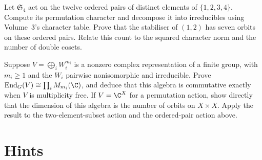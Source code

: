 \begin{exercise}[$\star\star$]\label{ex:v10exp-ch09-orderedpairs}
Let $\mathfrak S_4$ act on the twelve ordered pairs of distinct elements of $\{1,2,3,4\}$. Compute its permutation character and decompose it into irreducibles using Volume~3's character table. Prove that the stabiliser of $(1,2)$ has seven orbits on these ordered pairs. Relate this count to the squared character norm and the number of double cosets.
\end{exercise}

\begin{exercise}[$\star\star\star$]\label{ex:v10exp-ch09-commutant}
Suppose $V=\bigoplus_i W_i^{m_i}$ is a nonzero complex representation of a finite group, with $m_i\ge1$ and the $W_i$ pairwise nonisomorphic and irreducible. Prove
$\operatorname{End}_G(V)\cong\prod_iM_{m_i}(\C)$, and deduce that this algebra is commutative exactly when $V$ is multiplicity free. If $V=\C^X$ for a permutation action, show directly that the dimension of this algebra is the number of orbits on $X\times X$. Apply the result to the two-element-subset action and the ordered-pair action above.
\end{exercise}

\section{Hints}

